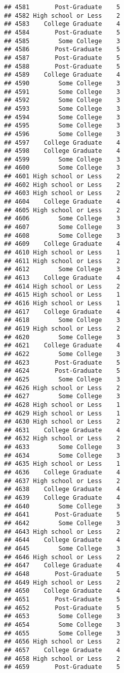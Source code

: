 \documentclass[
]{article}
\begin{document}
\begin{verbatim}
## 4581       Post-Graduate    5
## 4582 High school or Less    2
## 4583    College Graduate    4
## 4584       Post-Graduate    5
## 4585        Some College    3
## 4586       Post-Graduate    5
## 4587       Post-Graduate    5
## 4588       Post-Graduate    5
## 4589    College Graduate    4
## 4590        Some College    3
## 4591        Some College    3
## 4592        Some College    3
## 4593        Some College    3
## 4594        Some College    3
## 4595        Some College    3
## 4596        Some College    3
## 4597    College Graduate    4
## 4598    College Graduate    4
## 4599        Some College    3
## 4600        Some College    3
## 4601 High school or Less    2
## 4602 High school or Less    2
## 4603 High school or Less    2
## 4604    College Graduate    4
## 4605 High school or Less    2
## 4606        Some College    3
## 4607        Some College    3
## 4608        Some College    3
## 4609    College Graduate    4
## 4610 High school or Less    1
## 4611 High school or Less    2
## 4612        Some College    3
## 4613    College Graduate    4
## 4614 High school or Less    2
## 4615 High school or Less    1
## 4616 High school or Less    1
## 4617    College Graduate    4
## 4618        Some College    3
## 4619 High school or Less    2
## 4620        Some College    3
## 4621    College Graduate    4
## 4622        Some College    3
## 4623       Post-Graduate    5
## 4624       Post-Graduate    5
## 4625        Some College    3
## 4626 High school or Less    2
## 4627        Some College    3
## 4628 High school or Less    1
## 4629 High school or Less    1
## 4630 High school or Less    2
## 4631    College Graduate    4
## 4632 High school or Less    2
## 4633        Some College    3
## 4634        Some College    3
## 4635 High school or Less    1
## 4636    College Graduate    4
## 4637 High school or Less    2
## 4638    College Graduate    4
## 4639    College Graduate    4
## 4640        Some College    3
## 4641       Post-Graduate    5
## 4642        Some College    3
## 4643 High school or Less    2
## 4644    College Graduate    4
## 4645        Some College    3
## 4646 High school or Less    2
## 4647    College Graduate    4
## 4648       Post-Graduate    5
## 4649 High school or Less    2
## 4650    College Graduate    4
## 4651       Post-Graduate    5
## 4652       Post-Graduate    5
## 4653        Some College    3
## 4654        Some College    3
## 4655        Some College    3
## 4656 High school or Less    2
## 4657    College Graduate    4
## 4658 High school or Less    2
## 4659       Post-Graduate    5

\end{verbatim}
\end{document}
